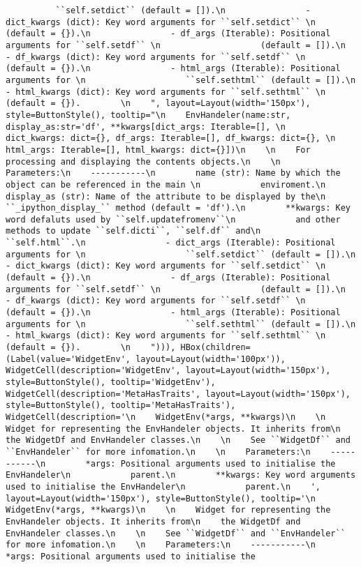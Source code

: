 \documentclass[11pt]{article}
\begin{document}
\begin{verbatim}
          ``self.setdict`` (default = []).\n                - dict_kwargs (dict): Key word arguments for ``self.setdict`` \n                    (default = {}).\n                - df_args (Iterable): Positional arguments for ``self.setdf`` \n                    (default = []).\n                - df_kwargs (dict): Key word arguments for ``self.setdf`` \n                    (default = {}).\n                - html_args (Iterable): Positional arguments for \n                    ``self.sethtml`` (default = []).\n                - html_kwargs (dict): Key word arguments for ``self.sethtml`` \n                    (default = {}).        \n    ", layout=Layout(width='150px'), style=ButtonStyle(), tooltip="\n    EnvHandeler(name:str, display_as:str='df', **kwargs[dict_args: Iterable=[], \n        dict_kwargs: dict={}, df_args: Iterable=[], df_kwargs: dict={}, \n        html_args: Iterable=[], html_kwargs: dict={}])\n    \n    For processing and displaying the contents objects.\n    \n    Parameters:\n    -----------\n        name (str): Name by which the object can be referenced in the main \n            enviroment.\n        display_as (str): Name of the attribute to be displayed by the\n            ``_ipython_display_`` method (default = 'df').\n        **kwargs: Key word defaluts used by ``self.updatefromenv``\n            and other methods to update ``self.dicti``, ``self.df`` and\n            ``self.html``.\n                - dict_args (Iterable): Positional arguments for \n                    ``self.setdict`` (default = []).\n                - dict_kwargs (dict): Key word arguments for ``self.setdict`` \n                    (default = {}).\n                - df_args (Iterable): Positional arguments for ``self.setdf`` \n                    (default = []).\n                - df_kwargs (dict): Key word arguments for ``self.setdf`` \n                    (default = {}).\n                - html_args (Iterable): Positional arguments for \n                    ``self.sethtml`` (default = []).\n                - html_kwargs (dict): Key word arguments for ``self.sethtml`` \n                    (default = {}).        \n    "))), HBox(children=(Label(value='WidgetEnv', layout=Layout(width='100px')), WidgetCell(description='WidgetEnv', layout=Layout(width='150px'), style=ButtonStyle(), tooltip='WidgetEnv'), WidgetCell(description='MetaHasTraits', layout=Layout(width='150px'), style=ButtonStyle(), tooltip='MetaHasTraits'), WidgetCell(description='\n    WidgetEnv(*args, **kwargs)\n    \n    Widget for representing the EnvHandeler objects. It inherits from\n    the WidgetDf and EnvHandeler classes.\n    \n    See ``WidgetDf`` and ``EnvHandeler`` for more infomation.\n    \n    Parameters:\n    -----------\n        *args: Positional arguments used to initialise the EnvHandeler\n            parent.\n        **kwargs: Key word arguments used to initialise the EnvHandeler\n            parent.\n    ', layout=Layout(width='150px'), style=ButtonStyle(), tooltip='\n    WidgetEnv(*args, **kwargs)\n    \n    Widget for representing the EnvHandeler objects. It inherits from\n    the WidgetDf and EnvHandeler classes.\n    \n    See ``WidgetDf`` and ``EnvHandeler`` for more infomation.\n    \n    Parameters:\n    -----------\n        *args: Positional arguments used to initialise the 
\end{verbatim}
\end{document}
